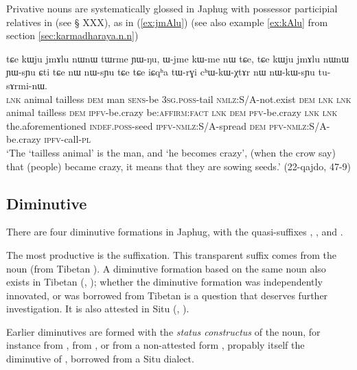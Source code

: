 Privative nouns are systematically glossed in Japhug with possessor participial relatives in  (see § XXX), as in (\ref{ex:jmAlu}) (see also example \ref{ex:kAlu} from section \ref{sec:karmadharaya.n.n})
 

\begin{exe}
\ex \label{ex:jmAlu}
\gll tɕe kɯju jmɤlu nɯnɯ tɯrme ɲɯ-ŋu, ɯ-jme kɯ-me nɯ tɕe, tɕe kɯju jmɤlu nɯnɯ ɲɯ-sɲu ɕti tɕe nɯ  nɯ-sɲu tɕe tɕe iɕqʰa tɯ-rɣi cʰɯ-kɯ-χtɤr nɯ nɯ-kɯ-sɲu tu-sɤrmi-nɯ. \\
\textsc{lnk} animal tailless \textsc{dem} man \textsc{sens}-be \textsc{3sg.poss}-tail \textsc{nmlz}:S/A-not.exist \textsc{dem} \textsc{lnk} \textsc{lnk} animal tailless  \textsc{dem} \textsc{ipfv}-be.crazy  be:\textsc{affirm}:\textsc{fact} \textsc{lnk} \textsc{dem} \textsc{pfv}-be.crazy \textsc{lnk} \textsc{lnk} the.aforementioned \textsc{indef.poss}-seed \textsc{ipfv}-\textsc{nmlz}:S/A-spread \textsc{dem} \textsc{pfv}-\textsc{nmlz}:S/A-be.crazy \textsc{ipfv}-call-\textsc{pl} \\
\glt `The `tailless animal' is the man, and `he becomes crazy', (when the crow say) that (people) became crazy, it means that they are sowing seeds.' (22-qajdo, 47-9)
\end{exe}

\subsection{Diminutive} \label{sec:diminutive}
There are four diminutive formations in Japhug, with the quasi-suffixes , ,  and .

The most productive is the  suffixation. This transparent suffix comes from the noun  (from Tibetan ). A diminutive formation based on the same noun also exists in Tibetan (\citealt{uray52diminutive},  \citealt[627]{hill14derivational}); whether the diminutive formation was independently innovated, or was borrowed from Tibetan is a question that deserves further investigation. It is also attested in Situ (\citealt{zhang16bragdbar}, \citealt[151]{lai17khroskyabs}).

Earlier diminutives are formed with the\textit{ status constructus} of the noun, for instance  from ,  from , or  from a non-attested form , propably itself the  diminutive of , borrowed from a Situ dialect.

